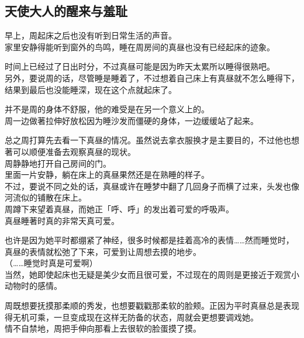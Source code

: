 
\subsection{天使大人的醒来与羞耻}

早上，周起床之后也没有听到日常生活的声音。\\

家里安静得能听到窗外的鸟鸣，睡在周房间的真昼也没有已经起床的迹象。

时间上已经过了日出时分，不过真昼可能是因为昨天太累所以睡得很熟吧。\\

另外，要说周的话，尽管睡是睡着了，不过想着自己床上有真昼就不怎么睡得下，结果到最后也没能睡深，现在这个点就起床了。

并不是周的身体不舒服，他的难受是在另一个意义上的。\\

周一边做著拉伸好放松因为睡沙发而僵硬的身体，一边缓缓站了起来。

总之周打算先去看一下真昼的情况。虽然说去拿衣服换才是主要目的，不过他也想著可以顺便准备去观察真昼的现状。\\

周静静地打开自己房间的门。\\

里面一片安静，躺在床上的真昼果然还是在熟睡的样子。\\

不过，要说不同之处的话，真昼或许在睡梦中翻了几回身子而横了过来，头发也像河流似的铺散在床上。\\

周蹲下来望着真昼，而她正「呼、呼」的发出着可爱的呼吸声。\\

真昼睡著时真的非常天真可爱。

也许是因为她平时都绷紧了神经，很多时候都是挂着高冷的表情……然而睡觉时，真昼的表情就松弛了下来，可爱到让周想去摸的地步。\\

（……睡觉时真是可爱啊）\\

当然，她即使起床也无疑是美少女而且很可爱，不过现在的周则是更接近于观赏小动物时的感情。

周既想要抚摸那柔顺的秀发，也想要戳戳那柔软的脸颊。正因为平时真昼总是表现得无机可乘，一旦变成现在这样无防备的状态，周就会更想要调戏她。\\

情不自禁地，周把手伸向那看上去很软的脸蛋摸了摸。\\

